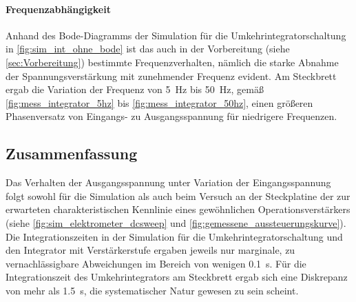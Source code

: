 \documentclass[12pt,english,ngerman]{scrartcl}
\begin{document}
\paragraph{Frequenzabhängigkeit}
Anhand des Bode-Diagramms der Simulation für die Umkehrintegratorschaltung in \autoref{fig:sim_int_ohne_bode} ist das auch in der
Vorbereitung (siehe \autoref{sec:Vorbereitung}) bestimmte Frequenzverhalten, nämlich die
starke Abnahme der Spannungsverstärkung mit zunehmender Frequenz evident. Am Steckbrett ergab die Variation
der Frequenz von \SI{5}{\hertz} bis \SI{50}{\hertz}, gemäß \autoref{fig:mess_integrator_5hz} bis
\autoref{fig:mess_integrator_50hz}, einen größeren Phasenversatz von Eingangs- zu Ausgangsspannung für
niedrigere Frequenzen.




\subsection{Zusammenfassung}
Das Verhalten der Ausgangsspannung unter Variation der Eingangsspannung folgt sowohl für die Simulation 
als auch beim Versuch an der Steckplatine der zur erwarteten charakteristischen Kennlinie 
eines gewöhnlichen Operationsverstärkers (siehe \autoref{fig:sim_elektrometer_dcsweep} und \autoref{fig:gemessene_aussteuerungskurve}).
\newline
Die Integrationszeiten in der Simulation für die Umkehrintegratorschaltung und den Integrator mit Verstärkerstufe 
ergaben jeweils nur marginale, zu vernachlässigbare
Abweichungen im Bereich von wenigen \SI{0,1}{\second}. Für die Integrationszeit des Umkehrintegrators am Steckbrett
ergab sich eine Diskrepanz von mehr als \SI{1,5}{\second}, die systematischer Natur gewesen zu sein scheint.
\newpage

\printbibliography

\listoffigures

\listoftables
\end{document}
